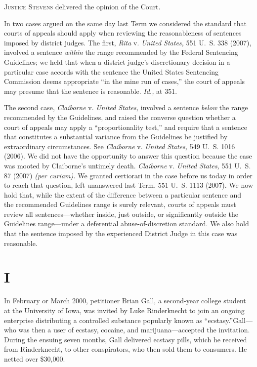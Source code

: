 
\setcounter{page}{40}

  \textsc{Justice Stevens} delivered the opinion of the Court.

  In two cases argued on the same day last Term we considered the
standard that courts of appeals should apply when reviewing the
reasonableness of sentences imposed by district judges. The first,
\emph{Rita} v. \emph{United States,} 551 U.~S. 338 (2007), involved a
sentence \emph{within} the range recommended by the Federal Sentencing
Guidelines; we held that when a district judge's discretionary
decision in a particular case accords with the sentence the United
States Sentencing Commission deems appropriate ``in the mine run
of cases,'' the court of appeals may presume that the sentence is
reasonable. \emph{Id.,} at 351.

  The second case, \emph{Claiborne} v. \emph{United States,} involved a
sentence \emph{below} the range recommended by the Guidelines, and
raised the converse question whether a court of appeals may apply a
``proportionality test,'' and require that a sen\newpage tence that
constitutes a substantial variance from the Guidelines be justified by
extraordinary circumstances. See \emph{Claiborne} v. \emph{United States,}
549 U.~S. 1016 (2006). We did not have the opportunity to answer
this question because the case was mooted by Claiborne's untimely
death. \emph{Claiborne} v. \emph{United States,} 551 U.~S. 87 (2007) \emph{(per
curiam).} We granted certiorari in the case before us today in order
to reach that question, left unanswered last Term. 551 U.~S. 1113
(2007). We now hold that, while the extent of the difference between
a particular sentence and the recommended Guidelines range is surely
relevant, courts of appeals must review all sentences---whether inside,
just outside, or significantly outside the Guidelines range---under a
deferential abuse-of-discretion standard. We also hold that the sentence
imposed by the experienced District Judge in this case was reasonable.

\section{I}

  In February or March 2000, petitioner Brian Gall, a second-year
college student at the University of Iowa, was invited by Luke
Rinderknecht to join an ongoing enterprise distributing a controlled
substance popularly known as ``ecstasy.''\footnotemark[1] Gall---who was then
a user of ecstasy, cocaine, and marijuana---accepted the invitation.
During the ensuing seven months, Gall delivered ecstasy pills, which he
received from Rinderknecht, to other conspirators, who then sold them to
consumers. He netted over \$30,000.

